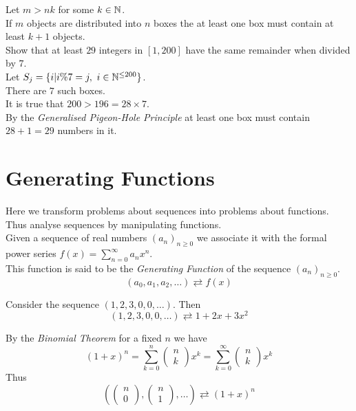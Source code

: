 \documentclass[11pt,a4paper]{article}
\begin{document}
Let $m>nk$ for some $k\in\mathbb{N}$.\\
If $m$ objects are distributed into $n$ boxes the at least one box must contain at least $k+1$ objects.\\

Show that at least $29$ integers in $[1,200]$ have the same remainder when divided by $7$.\\
Let $S_j=\{i|i\%7=j,\ i\in\mathbb{N}^{\leq200}\}$.\\
There are $7$ such boxes.\\
It is true that $200>196=28\times7$.\\
By the \textit{Generalised Pigeon-Hole Principle} at least one box must contain $28+1=29$ numbers in it.\\

\section{Generating Functions}

Here we transform problems about sequences into problems about functions.\\
Thus analyse sequences by manipulating functions.\\

Given a sequence of real numbers $(a_n)_{n\geq0}$ we associate it with the formal power series $f(x)=\sum\limits_{n=0}^\infty a_nx^n$.\\
This function is said to be the \textit{Generating Function} of the sequence $(a_n)_{n\geq0}$.
$$(a_0,a_1,a_2,\dots)\rightleftarrows f(x)$$

Consider the sequence $(1,2,3,0,0,\dots)$. Then
$$(1,2,3,0,0,\dots)\rightleftarrows1+2x+3x^2$$

By the \textit{Binomial Theorem} for a fixed $n$ we have
$$(1+x)^n=\sum\limits_{k=0}^n\begin{pmatrix}n\\k\end{pmatrix}x^k=\sum\limits_{k=0}^\infty\begin{pmatrix}n\\k\end{pmatrix}x^k$$
Thus
$$\left(\begin{pmatrix}n\\0\end{pmatrix},\begin{pmatrix}n\\1\end{pmatrix},\dots\right)\rightleftarrows(1+x)^n$$
\end{document}
